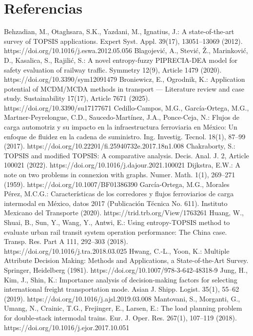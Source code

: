 \documentclass[runningheads]{llncs}
\begin{document}
\section{Referencias}
  Behzadian, M., Otaghsara, S.K., Yazdani, M., Ignatius, J.: A state-of-the-art survey of TOPSIS applications. Expert Syst. Appl. 39(17), 13051–13069 (2012). https://doi.org/10.1016/j.eswa.2012.05.056
  Blagojević, A., Stević, Ž., Marinković, D., Kasalica, S., Rajilić, S.: A novel entropy-fuzzy PIPRECIA-DEA model for safety evaluation of railway traffic. Symmetry 12(9), Article 1479 (2020). https://doi.org/10.3390/sym12091479
  Broniewicz, E., Ogrodnik, K.: Application potential of MCDM/MCDA methods in transport — Literature review and case study. Sustainability 17(17), Article 7671 (2025). https://doi.org/10.3390/su17177671
  Cedillo-Campos, M.G., García-Ortega, M.G., Martner-Peyrelongue, C.D., Saucedo-Martínez, J.A., Ponce-Ceja, N.: Flujos de carga automotriz y su impacto en la infraestructura ferroviaria en México: Un enfoque de fluidez en la cadena de suministro. Ing. Investig. Tecnol. 18(1), 87–99 (2017). https://doi.org/10.22201/fi.25940732e.2017.18n1.008
  Chakraborty, S.: TOPSIS and modified TOPSIS: A comparative analysis. Decis. Anal. J. 2, Article 100021 (2022). https://doi.org/10.1016/j.dajour.2021.100021
  Dijkstra, E.W.: A note on two problems in connexion with graphs. Numer. Math. 1(1), 269–271 (1959). https://doi.org/10.1007/BF01386390
  García-Ortega, M.G., Morales Pérez, M.C.G.: Características de los corredores y flujos ferroviarios de carga intermodal en México, datos 2017 (Publicación Técnica No. 611). Instituto Mexicano del Transporte (2020). https://trid.trb.org/View/1763261
  Huang, W., Shuai, B., Sun, Y., Wang, Y., Antwi, E.: Using entropy-TOPSIS method to evaluate urban rail transit system operation performance: The China case. Transp. Res. Part A 111, 292–303 (2018). https://doi.org/10.1016/j.tra.2018.03.025
  Hwang, C.-L., Yoon, K.: Multiple Attribute Decision Making: Methods and Applications, a State-of-the-Art Survey. Springer, Heidelberg (1981). https://doi.org/10.1007/978-3-642-48318-9
  Jung, H., Kim, J., Shin, K.: Importance analysis of decision-making factors for selecting international freight transportation mode. Asian J. Shipp. Logist. 35(1), 55–62 (2019). https://doi.org/10.1016/j.ajsl.2019.03.008
  Mantovani, S., Morganti, G., Umang, N., Crainic, T.G., Frejinger, E., Larsen, E.: The load planning problem for double-stack intermodal trains. Eur. J. Oper. Res. 267(1), 107–119 (2018). https://doi.org/10.1016/j.ejor.2017.10.051
\end{document}
